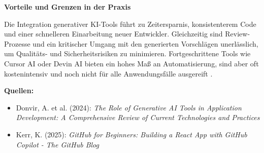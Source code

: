 \vspace{1em}
\noindent
\textbf{Vorteile und Grenzen in der Praxis}

Die Integration generativer KI-Tools führt zu Zeitersparnis, konsistenterem
Code und einer schnelleren Einarbeitung neuer Entwickler. Gleichzeitig sind
Review-Prozesse und ein kritischer Umgang mit den generierten Vorschlägen
unerlässlich, um Qualitäts- und Sicherheitsrisiken zu minimieren.
Fortgeschrittene Tools wie Cursor AI oder Devin AI bieten ein hohes Maß an
Automatisierung, sind aber oft kostenintensiv und noch nicht für alle
Anwendungsfälle ausgereift \cite[S.~13]{donvir_role_2024}.

\vspace{1em}
\noindent
\textbf{Quellen:}
\begin{itemize}
    \item Donvir, A. et al. (2024): \textit{The Role of Generative AI Tools in
              Application Development: A Comprehensive Review of Current Technologies and
              Practices} \cite{donvir_role_2024}
    \item Kerr, K. (2025): \textit{GitHub for Beginners: Building a React App with GitHub
              Copilot - The GitHub Blog} \cite{kerr_github_nodate}
\end{itemize}
